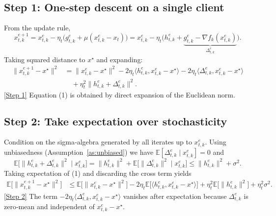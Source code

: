 \documentclass{article}
\newcommand{\E}{\mathbb{E}}
\begin{document}
\subsection*{Step 1: One‑step descent on a single client}
From the update rule,
\[
    x_{t,k}^{e+1}=x_{t,k}^{e}-\eta_t\bigl(g_{t,k}^{e}+\mu(x_{t,k}^{e}-x_t)\bigr)
    =x_{t,k}^{e}-\eta_t\bigl(h_{t,k}^{e}+ \underbrace{g_{t,k}^{e}-\nabla f_k(x_{t,k}^{e})}_{\Delta_{t,k}^{e}}\bigr).
\]
Taking squared distance to $x^\star$ and expanding:
\begin{align}
    \|x_{t,k}^{e+1}-x^\star\|^2
    &=\|x_{t,k}^{e}-x^\star\|^2
      -2\eta_t\langle h_{t,k}^{e},x_{t,k}^{e}-x^\star\rangle
      -2\eta_t\langle\Delta_{t,k}^{e},x_{t,k}^{e}-x^\star\rangle \nonumber\\
    &\quad +\eta_t^2\|h_{t,k}^{e}+\Delta_{t,k}^{e}\|^2 . \tag{1}
\end{align}
\noindent\underline{[Step 1]} Equation (1) is obtained by direct expansion of the Euclidean norm.

\subsection*{Step 2: Take expectation over stochasticity}
Condition on the sigma‑algebra generated by all iterates up to $x_{t,k}^{e}$.
Using unbiasedness (Assumption~\ref{as:unbiased}) we have $\E[\Delta_{t,k}^{e}\mid x_{t,k}^{e}]=0$ and
\[
    \E\!\bigl[\|h_{t,k}^{e}+\Delta_{t,k}^{e}\|^2\mid x_{t,k}^{e}\bigr]
    =\|h_{t,k}^{e}\|^2+\E\!\bigl[\|\Delta_{t,k}^{e}\|^2\mid x_{t,k}^{e}\bigr]
    \le\|h_{t,k}^{e}\|^2+\sigma^2 .
\]
Taking expectation of (1) and discarding the cross term yields
\begin{align}
    \E\!\bigl[\|x_{t,k}^{e+1}-x^\star\|^2\bigr]
    &\le \E\!\bigl[\|x_{t,k}^{e}-x^\star\|^2\bigr]
       -2\eta_t\E\!\bigl[\langle h_{t,k}^{e},x_{t,k}^{e}-x^\star\rangle\bigr]
       +\eta_t^2\E\!\bigl[\|h_{t,k}^{e}\|^2\bigr]
       +\eta_t^2\sigma^2 . \tag{2}
\end{align}
\noindent\underline{[Step 2]} The term $-2\eta_t\langle\Delta_{t,k}^{e},x_{t,k}^{e}-x^\star\rangle$ vanishes after expectation because $\Delta_{t,k}^{e}$ is zero‑mean and independent of $x_{t,k}^{e}-x^\star$.
\end{document}

